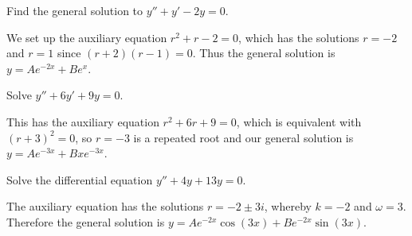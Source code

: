 \begin{example}
	Find the general solution to $y'' + y' - 2y = 0$.

	We set up the auxiliary equation $r^2 + r - 2 = 0$, which has the solutions $r = -2$ and $r = 1$ since $(r + 2)(r - 1) = 0$.
	Thus the general solution is $y = A e^{-2 x} + B e^{x}$.
\end{example}

\begin{example}
	Solve $y'' + 6 y' + 9 y = 0$.

	This has the auxiliary equation $r^2 + 6 r + 9 = 0$, which is equivalent with $(r + 3)^2 = 0$, so $r = -3$ is a repeated root and our general solution is $y = A e^{-3x} + B x e^{-3x}$.
\end{example}

\begin{example}
	Solve the differential equation $y'' + 4 y + 13 y = 0$.

	The auxiliary equation has the solutions $r = -2 \pm 3 i$, whereby $k = -2$ and $\omega = 3$.
	Therefore the general solution is $y = A e^{-2 x} \cos(3 x) + B e^{-2 x} \sin(3 x)$.
\end{example}
